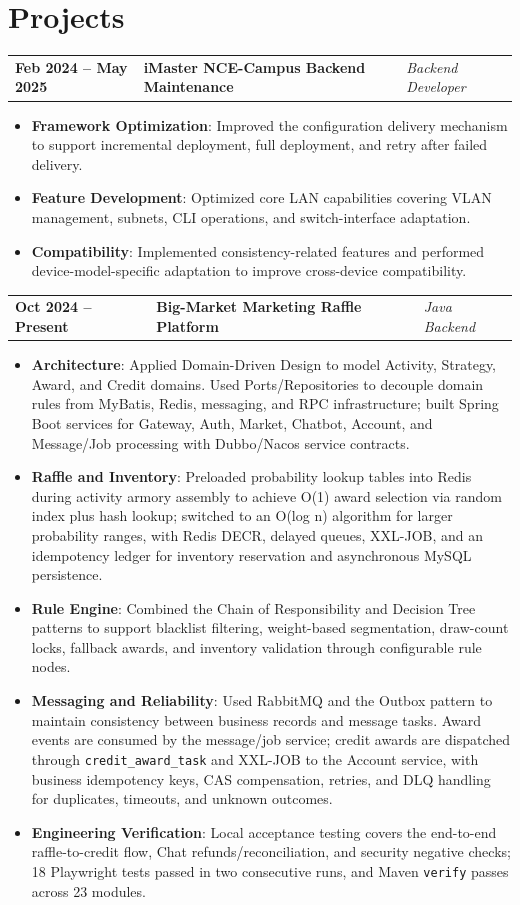 \documentclass[10pt,a4paper]{article}
\makeatletter
\newcommand{\entry}[3]{%
  \noindent
  \begin{tabular*}{\textwidth}{@{}>{\bfseries}p{0.20\textwidth}@{\hfill}>{\raggedright\arraybackslash}p{0.42\textwidth}@{\hfill}>{\raggedleft\arraybackslash}p{0.32\textwidth}@{}}
    #1 & \textbf{#2} & {\small\itshape #3}\\
  \end{tabular*}\par
}
\makeatother
\begin{document}
\section{Projects}
\entry{Feb 2024 -- May 2025}{iMaster NCE-Campus Backend Maintenance}{Backend Developer}
\begin{itemize}
  \item \textbf{Framework Optimization}: Improved the configuration delivery mechanism to support incremental deployment, full deployment, and retry after failed delivery.
  \item \textbf{Feature Development}: Optimized core LAN capabilities covering VLAN management, subnets, CLI operations, and switch-interface adaptation.
  \item \textbf{Compatibility}: Implemented consistency-related features and performed device-model-specific adaptation to improve cross-device compatibility.
\end{itemize}

\vspace{0.15em}

\entry{Oct 2024 -- Present}{Big-Market Marketing Raffle Platform}{Java Backend}
\begin{itemize}
  \item \textbf{Architecture}: Applied Domain-Driven Design to model Activity, Strategy, Award, and Credit domains. Used Ports/\allowbreak Repositories to decouple domain rules from MyBatis, Redis, messaging, and RPC infrastructure; built Spring Boot services for Gateway, Auth, Market, Chatbot, Account, and Message/\allowbreak Job processing with Dubbo/Nacos service contracts.
  \item \textbf{Raffle and Inventory}: Preloaded probability lookup tables into Redis during activity armory assembly to achieve O(1) award selection via random index plus hash lookup; switched to an O(log n) algorithm for larger probability ranges, with Redis DECR, delayed queues, XXL-JOB, and an idempotency ledger for inventory reservation and asynchronous MySQL persistence.
  \item \textbf{Rule Engine}: Combined the Chain of Responsibility and Decision Tree patterns to support blacklist filtering, weight-based segmentation, draw-count locks, fallback awards, and inventory validation through configurable rule nodes.
  \item \textbf{Messaging and Reliability}: Used RabbitMQ and the Outbox pattern to maintain consistency between business records and message tasks. Award events are consumed by the message/job service; credit awards are dispatched through \texttt{credit\_award\_task} and XXL-JOB to the Account service, with business idempotency keys, CAS compensation, retries, and DLQ handling for duplicates, timeouts, and unknown outcomes.
  \item \textbf{Engineering Verification}: Local acceptance testing covers the end-to-end raffle-to-credit flow, Chat refunds/\allowbreak reconciliation, and security negative checks; 18 Playwright tests passed in two consecutive runs, and Maven \texttt{verify} passes across 23 modules.
\end{itemize}
\end{document}
